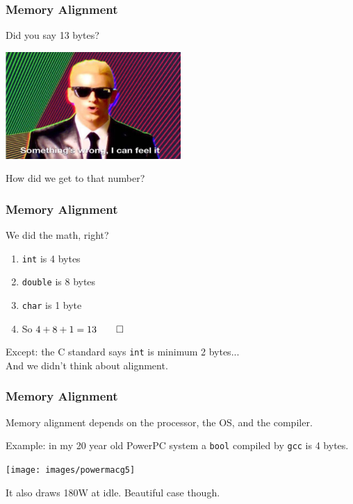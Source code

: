 \begin{frame}
\frametitle{Memory Alignment}

Did you say 13 bytes?

\begin{center}
  \includegraphics[width=0.5\textwidth]{images/somethingswrong.jpg}
\end{center}

How did we get to that number?

\end{frame}

\begin{frame}
\frametitle{Memory Alignment}

We did the math, right? \vspace{-4em}
\begin{enumerate}
	\item \texttt{int} is 4 bytes
	\item \texttt{double} is 8 bytes
	\item \texttt{char} is 1 byte
	\item So $4 + 8 + 1 = 13 \qed$ 
\end{enumerate}

Except: the C standard says \texttt{int} is minimum 2 bytes...\\
\quad And we didn't think about alignment.

\end{frame}

\begin{frame}
\frametitle{Memory Alignment}

Memory alignment depends on the processor, the OS, and the compiler.

Example: in my 20 year old PowerPC system a \texttt{bool} compiled by \texttt{gcc} is 4 bytes.

\begin{center}
  \texttt{[image: images/powermacg5]}
\end{center}

It also draws 180W at idle. Beautiful case though.
\end{frame}

